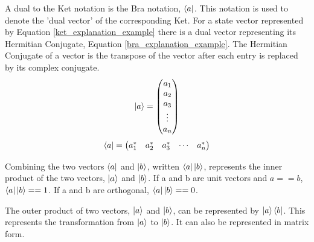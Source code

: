 A dual to the Ket notation is the Bra notation, $\left\langle{a}\right\vert$.
This notation is used to denote the 'dual vector' of the corresponding Ket.
For a state vector represented by Equation \ref{ket_explanation_example} there is a dual vector representing its Hermitian Conjugate, Equation \ref{bra_explanation_example}.
The Hermitian Conjugate of a vector is the transpose of the vector after each entry is replaced by its complex conjugate.
\begin{equation}
\label{ket_explanation_example}
\left\vert{a}\right\rangle = 
\begin{pmatrix}
a_1\\
a_2\\
a_3\\
\vdots \\
a_n
\end{pmatrix}
\end{equation}
\begin{equation}
\label{bra_explanation_example}
\left\langle{a}\right\vert = 
\begin{pmatrix}
a_1^{*}&
a_2^{*}&
a_3^{*}&
\cdots &
a_n^{*}
\end{pmatrix}
\end{equation}

Combining the two vectors $\left\langle{a}\right\vert$ and $\left\vert{b}\right\rangle$, written $\left\langle{a}\right\vert\left\vert{b}\right\rangle$, represents the inner product of the two vectors, $\left\vert{a}\right\rangle$ and $\left\vert{b}\right\rangle$.
If a and b are unit vectors and $a == b$, $\left\langle{a}\right\vert\left\vert{b}\right\rangle == 1$.
If a and b are orthogonal, $\left\langle{a}\right\vert\left\vert{b}\right\rangle == 0$.

The outer product of two vectors, $\left\vert{a}\right\rangle$ and $\left\vert{b}\right\rangle$, can be represented by $\left\vert{a}\right\rangle\left\langle{b}\right\vert$.
This represents the transformation from $\left\vert{a}\right\rangle$ to $\left\vert{b}\right\rangle$.
It can also be represented in matrix form.

